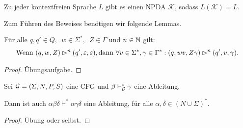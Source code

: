 \begin{lemma}\label{lem:4.cfgToNpda}
 Zu jeder kontextfreien Sprache $L$ gibt es einen \ac{NPDA} $\mathcal{K}$, sodass $L(\mathcal{K})=L$.
\end{lemma}

Zum Führen des Beweises benötigen wir folgende Lemmas.

\begin{lemma}\label{lem:4.mehrKeller}
  Für alle $q,q' \in Q,\enspace w \in \Sigma^*,\enspace Z \in \Gamma$ und $n \in \mathbb{N}$ gilt:
  \begin{displaymath}
    \text{Wenn } (q,w,Z) \rhd^n (q', \varepsilon, \varepsilon), \text{dann } \forall v \in \Sigma^*, \gamma \in \Gamma^*: (q, wv, Z\gamma) \rhd^n (q', v, \gamma).
    \qedhere
  \end{displaymath}
\end{lemma}
\begin{proof}
Übungsaufgabe.
\end{proof}

\begin{lemma}\label{lem:einbettung-ableitung}
  Sei $\mathcal{G}= (\Sigma, N, P, S)$ eine \ac{CFG} und $\beta \vdash^*_{\mathcal{G}}
  \gamma$ eine Ableitung.

  Dann ist auch  $\alpha\beta\delta \vdash^* \alpha\gamma\delta$ eine
  Ableitung, für alle $\alpha, \delta \in (N \cup \Sigma)^*$.
\end{lemma}
\begin{proof}
  Übung oder selbst.
\end{proof}

